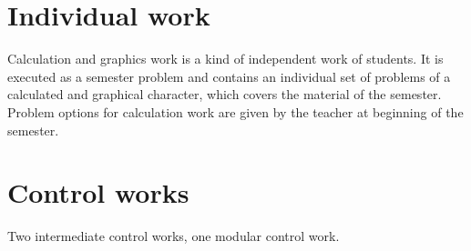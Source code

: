 \documentclass{rnp}
\begin{document}
%
\section{Individual work}
%

Calculation and graphics work is a kind of independent work of students. It is executed as a semester problem and contains an individual set of problems of a calculated and graphical character, which covers the material of the semester. Problem options for calculation work are given by the teacher at beginning of the semester.


%
\section{Control works}
%

Two intermediate control works, one modular control work.
\end{document}
